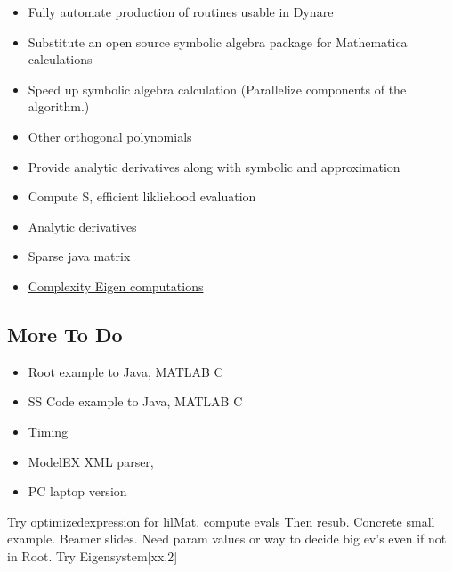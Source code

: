 \documentclass[12pt]{article}
\begin{document}
  \begin{itemize}
  \item Fully automate production of routines usable in Dynare
  \item Substitute an open source symbolic algebra package for Mathematica calculations
  \item Speed up symbolic algebra calculation (Parallelize components of the algorithm.)
  \item Other orthogonal polynomials
\item Provide analytic derivatives along with symbolic and approximation
\item Compute S, efficient likliehood evaluation
\item Analytic derivatives
\item Sparse java matrix
\item \href{http://cstheory.stackexchange.com/questions/2611/complexity-of-finding-the-eigendecomposition-of-a-matrix}{Complexity Eigen computations}
  \end{itemize}


  \subsection{More To Do}
  \begin{itemize}
  \item Root example  to Java, MATLAB C
  \item SS Code example to Java, MATLAB C
  \item Timing
  \item ModelEX XML parser,
  \item PC laptop version
  \end{itemize}





Try optimizedexpression for lilMat.
compute evals Then resub.
Concrete small example.
Beamer slides.
Need param values or way to decide big ev's even if not in  Root.
Try Eigensystem[xx,2]
\end{document}

